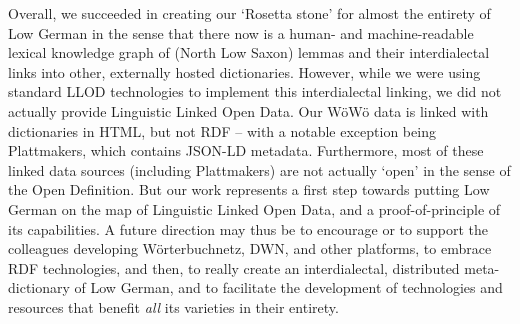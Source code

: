 Overall, we succeeded in creating our `Rosetta stone' for almost the entirety of Low German in the sense that there now is a human- and machine-readable lexical knowledge graph of (North Low Saxon) lemmas and their interdialectal links into other, externally hosted dictionaries.
However, while we were using standard LLOD technologies to implement this interdialectal linking, we did not actually provide Linguistic Linked Open Data. Our WöWö data is linked with dictionaries in HTML, but not RDF -- with a notable exception being Plattmakers, which contains JSON-LD metadata. 
Furthermore, most of these linked data sources (including Plattmakers) are not actually `open' in the sense of the Open Definition. 
But our work represents a first step towards putting Low German on the map of Linguistic Linked Open Data, and a proof-of-principle of its capabilities.
A future direction may thus be to encourage or to support the colleagues developing Wörterbuchnetz, DWN, and other platforms, to embrace RDF technologies, and then, to really create an interdialectal, distributed meta-dictionary of Low German, and to facilitate the development of technologies and resources that benefit \emph{all} its varieties in their entirety.
